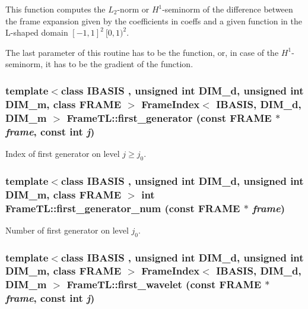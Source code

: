This function computes the $L_2$-norm or $H^1$-seminorm of the difference between the frame expansion given by the coefficients in coeffs and a given function in the L-shaped domain $[-1,1]^2 \ [0,1)^2$. 

The last parameter of this routine has to be the function, or, in case of the $H^1$-seminorm, it has to be the gradient of the function. \hypertarget{namespaceFrameTL_6f69a38cdff114000317fd48750b471b}{
\subsubsection[{first\_\-generator}]{\setlength{\rightskip}{0pt plus 5cm}template$<$class IBASIS , unsigned int DIM\_\-d, unsigned int DIM\_\-m, class FRAME $>$ {\bf FrameIndex}$<$ IBASIS, DIM\_\-d, DIM\_\-m $>$ FrameTL::first\_\-generator (const FRAME $\ast$ {\em frame}, \/  const int {\em j})}}
\label{namespaceFrameTL_6f69a38cdff114000317fd48750b471b}


Index of first generator on level $j \geq j_0$. \hypertarget{namespaceFrameTL_80cab15b10b2b3bff9e29f51409f7ce7}{
\subsubsection[{first\_\-generator\_\-num}]{\setlength{\rightskip}{0pt plus 5cm}template$<$class IBASIS , unsigned int DIM\_\-d, unsigned int DIM\_\-m, class FRAME $>$ int FrameTL::first\_\-generator\_\-num (const FRAME $\ast$ {\em frame})}}
\label{namespaceFrameTL_80cab15b10b2b3bff9e29f51409f7ce7}


Number of first generator on level $j_0$. \hypertarget{namespaceFrameTL_ad2c37c6767c23fca5c2c3e1563680a5}{
\subsubsection[{first\_\-wavelet}]{\setlength{\rightskip}{0pt plus 5cm}template$<$class IBASIS , unsigned int DIM\_\-d, unsigned int DIM\_\-m, class FRAME $>$ {\bf FrameIndex}$<$ IBASIS, DIM\_\-d, DIM\_\-m $>$ FrameTL::first\_\-wavelet (const FRAME $\ast$ {\em frame}, \/  const int {\em j})}}
\label{namespaceFrameTL_ad2c37c6767c23fca5c2c3e1563680a5}



